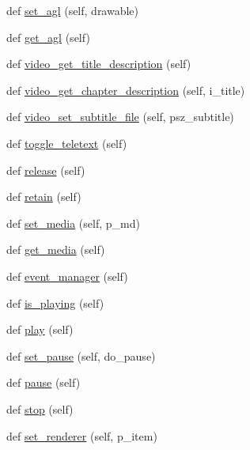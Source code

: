 \begin{DoxyCompactItemize}
def \hyperlink{classvlc_1_1_media_player_ac4c4fcc49773eef53d5666f1c1365d71}{set\+\_\+agl} (self, drawable)
\item 
def \hyperlink{classvlc_1_1_media_player_a9b040825ae99c2db63307dee719c4155}{get\+\_\+agl} (self)
\item 
def \hyperlink{classvlc_1_1_media_player_a2e9b941fc96e22aa8f7c1a0e48c1e6d1}{video\+\_\+get\+\_\+title\+\_\+description} (self)
\item 
def \hyperlink{classvlc_1_1_media_player_aa0d4ef63e93059de3f836a54dc2fda67}{video\+\_\+get\+\_\+chapter\+\_\+description} (self, i\+\_\+title)
\item 
def \hyperlink{classvlc_1_1_media_player_ae40ff9e2747b2ae1910f3c302776b242}{video\+\_\+set\+\_\+subtitle\+\_\+file} (self, psz\+\_\+subtitle)
\item 
def \hyperlink{classvlc_1_1_media_player_ab7ff5c93b754829e1df408e1e79dd1ed}{toggle\+\_\+teletext} (self)
\item 
def \hyperlink{classvlc_1_1_media_player_a4cd51e19135e5ad4a19eae3ea9c60537}{release} (self)
\item 
def \hyperlink{classvlc_1_1_media_player_a6394d82a0b79f0f91bb059d20ab43490}{retain} (self)
\item 
def \hyperlink{classvlc_1_1_media_player_a8d4d4151676c2941cdd0cee4e25648c5}{set\+\_\+media} (self, p\+\_\+md)
\item 
def \hyperlink{classvlc_1_1_media_player_a1fa2f551dca8d895dc9639984cfb819b}{get\+\_\+media} (self)
\item 
def \hyperlink{classvlc_1_1_media_player_ab7c92812cd259eb8e4e4fd292b81bfaa}{event\+\_\+manager} (self)
\item 
def \hyperlink{classvlc_1_1_media_player_a48c6394263dfdf45970dbd872d52c8d8}{is\+\_\+playing} (self)
\item 
def \hyperlink{classvlc_1_1_media_player_a9942567d8012950a20b0798b4203bb57}{play} (self)
\item 
def \hyperlink{classvlc_1_1_media_player_ab35d8dc9f1faad46ff204872a225ad49}{set\+\_\+pause} (self, do\+\_\+pause)
\item 
def \hyperlink{classvlc_1_1_media_player_aee7a4c35e3232c131ff62b5866eb4a16}{pause} (self)
\item 
def \hyperlink{classvlc_1_1_media_player_a26ca7c1c7fcdd35378e7be97727047a6}{stop} (self)
\item 
def \hyperlink{classvlc_1_1_media_player_ac5e81ce9112a3e7c8ac0eecfc5334972}{set\+\_\+renderer} (self, p\+\_\+item)
\item 

\end{DoxyCompactItemize}
